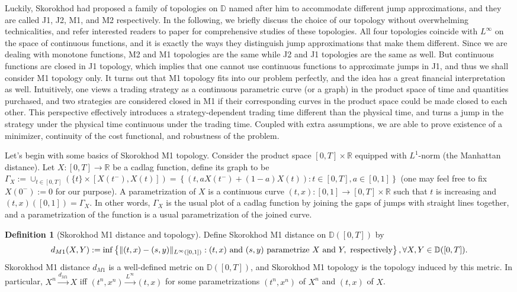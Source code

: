 \documentclass[openany,oneside]{article}
\theoremstyle{definition}
\newtheorem{defn}[thm]{Definition}
\theoremstyle{remark}
\DeclarePairedDelimiter{\norm}{\lVert}{\rVert} %
\begin{document}
Luckily, Skorokhod\cite{skorokhod1956limit} had proposed a family of topologies on $\mathbb{D}$ named after him to accommodate different jump approximations, and they are called J1, J2, M1, and M2 respectively. In the following, we briefly discuss the choice of our topology without overwhelming technicalities, and refer interested readers to \citeauthor{skorokhod1956limit} \citeyear{skorokhod1956limit} paper for comprehensive studies of these topologies. All four topologies coincide with $L^\infty$ on the space of continuous functions, and it is exactly the ways they distinguish jump approximations that make them different. Since we are dealing with monotone functions, M2 and M1 topologies are the same while J2 and J1 topologies are the same as well. But continuous functions are closed in J1 topology, which implies that one cannot use continuous functions to approximate jumps in J1, and thus we shall consider M1 topology only. It turns out that M1 topology fits into our problem perfectly, and the idea has a great financial interpretation as well. Intuitively, one views a trading strategy as a continuous parametric curve (or a graph) in the product space of time and quantities purchased, and two strategies are considered closed in M1 if their corresponding curves in the product space could be made closed to each other. This perspective effectively introduces a strategy-dependent trading time different than the physical time, and turns a jump in the strategy under the physical time continuous under the trading time. Coupled with extra assumptions, we are able to prove existence of a minimizer, continuity of the cost functional, and robustness of the problem.

Let's begin with some basics of Skorokhod M1 topology. Consider the product space $[0,T]\times \mathbb{R}$ equipped with $L^1$-norm (the Manhattan distance). Let $X:[0,T]\to \mathbb{R}$ be a cadlag function, define its graph to be $\Gamma_X := \cup_{t\in[0,T]}\left(\{t\} \times [X(t^-), X(t)]\right) = \left\{ \left(t,aX(t^-)+(1-a)X(t)\right) : t\in[0,T], a\in[0,1] \right\}$ (one may feel free to fix $X(0^-):=0$ for our purpose). A parametrization of $X$ is a continuous curve $(t,x):[0,1]\to [0,T]\times\mathbb{R}$ such that $t$ is increasing and $(t,x)([0,1])=\Gamma_X$. In other words, $\Gamma_X$ is the usual plot of a cadlag function by joining the gaps of jumps with straight lines together, and a parametrization of the function is a usual parametrization of the joined curve. 

\begin{defn}[Skorokhod M1 distance and topology]
Define Skorokhod M1 distance on $\mathbb{D}([0,T])$ by
$$d_{M1}(X,Y) := \inf\left\{ \norm{(t,x)-(s,y)}_{L^\infty([0,1])} : (t,x) \textrm{ and } (s,y) \textrm{ parametrize } X \textrm{ and } Y, \textrm{ respectively} \right\}, \forall X,Y \in \mathbb{D}([0,T]).$$
Skorokhod M1 distance $d_{M1}$ is a well-defined metric on $\mathbb{D}([0,T])$, and Skorokhod M1 topology is the topology induced by this metric. In particular, $X^{n} \xrightarrow{d_{M1}} X$ iff $(t^n,x^n) \xrightarrow{L^\infty} (t,x)$ for some parametrizations $(t^n,x^n)$ of $X^n$ and $(t,x)$ of $X$.
\end{defn}
\end{document}
